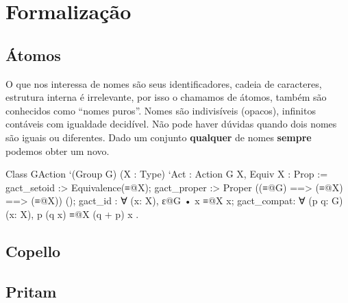 \chapter{Formalização}\label{chp:formalizacao}

\section{Átomos}
O que nos interessa de nomes são seus identificadores, cadeia de caracteres, estrutura interna é irrelevante, por isso o chamamos de átomos, também são conhecidos como ``nomes puros''. Nomes são indivisíveis (opacos), infinitos contáveis com igualdade decidível. Não pode haver dúvidas quando dois nomes são iguais ou diferentes. Dado um conjunto \textbf{qualquer} de nomes \textbf{sempre} podemos obter um novo.

\begin{coqcode}
	Class GAction `(Group G) (X : Type) `{Act : Action G X, Equiv X} : Prop := {
		gact_setoid :> Equivalence(≡@{X});
		gact_proper :> Proper ((≡@{G}) ==> (≡@{X}) ==> (≡@{X})) ();
		gact_id : ∀ (x: X), ε@{G} • x ≡@{X} x;
		gact_compat: ∀ (p q: G) (x: X), p  (q  x) ≡@{X} (q + p)  x
	}.
\end{coqcode}

\section{Copello}
\section{Pritam}